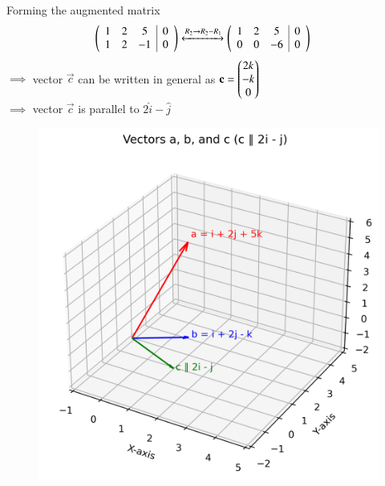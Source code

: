 \documentclass[journal]{IEEEtran}
\begin{document}
Forming the augmented matrix
\begin{align}
    \left(\begin{array}{ccc|c}
        1 & 2 & 5 & 0 \\
        1 & 2 & -1 & 0 
\end{array}\right) &\xleftrightarrow{R_2 \rightarrow R_2- R_1} \left(\begin{array}{ccc|c}
        1 & 2 & 5 & 0 \\
        0 & 0 & -6 & 0 
\end{array}\right)
\end{align}
$\implies$ vector $\vec{c}$ can be written in general as $\mathbf{c}=\begin{pmatrix}2k\\-k\\0\end{pmatrix}$ \\
$\implies$ vector $\vec{c}$ is parallel to $2\hat{i} - \hat{j}$
\begin{figure}
    \centering
    \includegraphics[width=0.52\columnwidth]{figs/01.png}
    \caption{}
    \label{fig:placeholder}
\end{figure}
\end{document}
